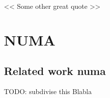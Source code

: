 \begin{savequote}[6cm]
<< Some other great quote  >>
\end{savequote}
\chapter{NUMA}
\chaptertoc

\section{Related work numa}\label{sec:intro:titre}

TODO: subdivise this
Blabla
